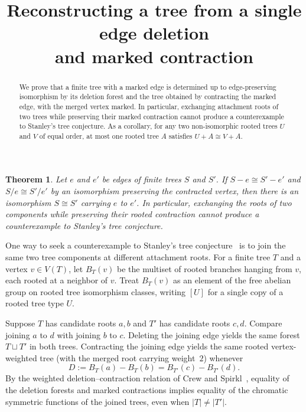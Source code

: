 \documentclass[10pt]{article}
\title{Reconstructing a tree from a single edge deletion\\ and marked contraction}
\author{}
\date{}
\newtheorem{theorem}{Theorem}
\begin{document}
\maketitle
\vspace{-2.5em}

\begin{abstract}
We prove that a finite tree with a marked edge is determined up to edge-preserving isomorphism by its deletion forest and the tree obtained by contracting the marked edge, with the merged vertex marked. In particular, exchanging attachment roots of two trees while preserving their marked contraction cannot produce a counterexample to Stanley's tree conjecture. As a corollary, for any two non-isomorphic rooted trees $U$ and $V$ of equal order, at most one rooted tree $A$ satisfies $U+A\cong V+A$.
\end{abstract}

\begin{theorem}\label{thm:single-edge}
Let $e$ and $e'$ be edges of finite trees $S$ and $S'$. If $S-e\cong S'-e'$ and $S/e\cong S'/e'$ by an isomorphism preserving the contracted vertex, then there is an isomorphism $S\cong S'$ carrying $e$ to $e'$. In particular, exchanging the roots of two components while preserving their rooted contraction cannot produce a counterexample to Stanley's tree conjecture.
\end{theorem}

One way to seek a counterexample to Stanley's tree conjecture~\cite{stanley1995} is to join the same two tree components at different attachment roots. For a finite tree $T$ and a vertex $v\in V(T)$, let $B_T(v)$ be the multiset of rooted branches hanging from $v$, each rooted at a neighbor of $v$. Treat $B_T(v)$ as an element of the free abelian group on rooted tree isomorphism classes, writing $[U]$ for a single copy of a rooted tree type $U$.

Suppose $T$ has candidate roots $a,b$ and $T'$ has candidate roots $c,d$. Compare joining $a$ to $d$ with joining $b$ to $c$. Deleting the joining edge yields the same forest $T\sqcup T'$ in both trees. Contracting the joining edge yields the same rooted vertex-weighted tree (with the merged root carrying weight~$2$) whenever
\[
D := B_T(a) - B_T(b) = B_{T'}(c) - B_{T'}(d).
\]
By the weighted deletion--contraction relation of Crew and Spirkl~\cite{crew-spirkl}, equality of the deletion forests and marked contractions implies equality of the chromatic symmetric functions of the joined trees, even when $|T|\neq |T'|$.
\end{document}
